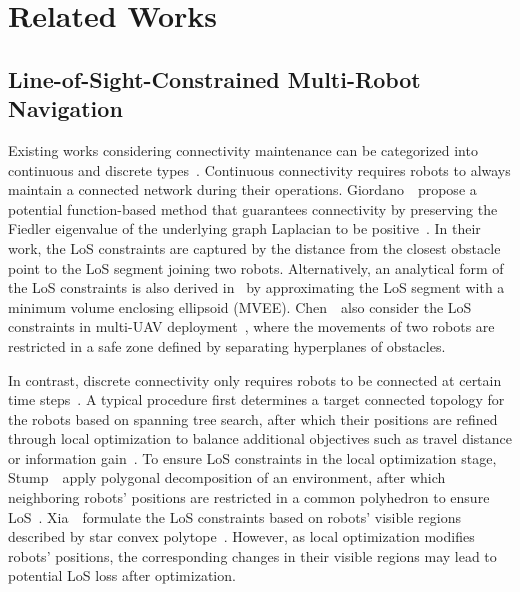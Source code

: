 \section{Related Works}
\subsection{Line-of-Sight-Constrained Multi-Robot Navigation}

Existing works considering connectivity maintenance can be categorized into continuous and discrete types~\cite{amigoni_MultirobotExploration_2017}.
Continuous connectivity requires robots to always maintain a connected network during their operations.
Giordano~\etal~propose a potential function-based method that guarantees connectivity by preserving the Fiedler eigenvalue of the underlying graph Laplacian to be positive~\cite{robuffogiordano_PassivitybasedDecentralized_2013, amigoni_MultirobotExploration_2017}.
In their work, the LoS constraints are captured by the distance from the closest obstacle point to the LoS segment joining two robots.
Alternatively, an analytical form of the LoS constraints is also derived in~\cite{yang_MinimallyConstrained_2023} by approximating the LoS segment with a minimum volume enclosing ellipsoid (MVEE).
Chen~\etal~also consider the LoS constraints in multi-UAV deployment~\cite{chen_MultiUAVDeployment_2023}, where the movements of two robots are restricted in a safe zone defined by separating hyperplanes of obstacles.






In contrast, discrete connectivity only requires robots to be connected at certain time steps~\cite{hollinger_MultirobotCoordination_2012}.
A typical procedure first determines a target connected topology for the robots based on spanning tree search, after which their positions are refined through local optimization to balance additional objectives such as travel distance or information gain~\cite{shi_CommunicationAwareMultirobot_2021, stump_VisibilitybasedDeployment_2011, dutta_MultirobotInformative_2019, xia_RELINKRealTime_2023}.
To ensure LoS constraints in the local optimization stage, Stump~\etal~apply polygonal decomposition of an environment, after which neighboring robots' positions are restricted in a common polyhedron to ensure LoS~\cite{stump_VisibilitybasedDeployment_2011}.
Xia~\etal~formulate the LoS constraints based on robots' visible regions described by star convex polytope~\cite{xia_RELINKRealTime_2023}.
However, as local optimization modifies robots' positions, the corresponding changes in their visible regions may lead to potential LoS loss after optimization.

